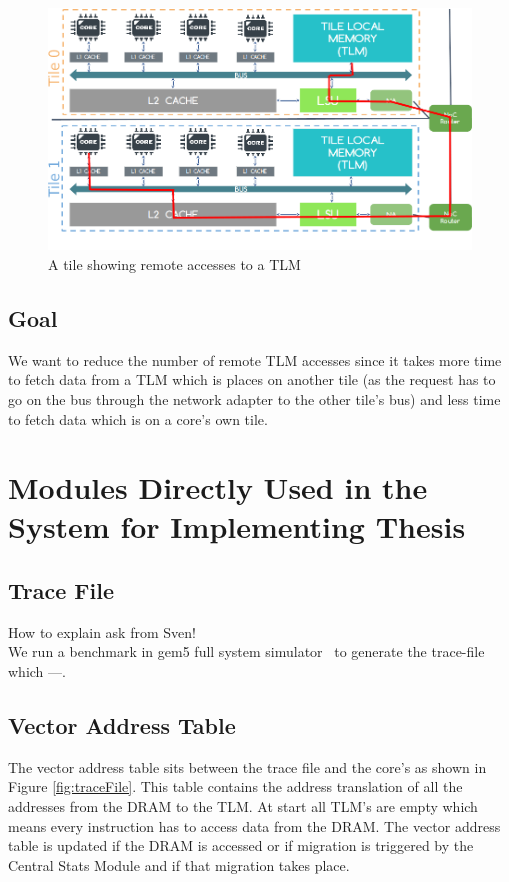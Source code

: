 \documentclass{listhesis}
\begin{document}
\begin{figure}
  \includegraphics[width=\linewidth]{remoteaccesses.png}
  \centering
  \caption{A tile showing remote accesses to a TLM}
  \label{fig:remoteaccesses}
\end{figure}
\subsection{Goal}
We want to reduce the number of remote TLM accesses since it takes more time to fetch data from a TLM which is places on another tile (as the request has to go on the bus through the network adapter to the other tile's bus) and less time to fetch data which is on a core's own tile.  
\section{Modules Directly Used in the System for Implementing Thesis}
\subsection{Trace File}
How to explain ask from Sven! 
\\
We run a benchmark in gem5 full system simulator~\cite{gem5} to generate the trace-file which ---. 
\subsection{Vector Address Table}
The vector address table sits between the trace file and the core's as shown in Figure \ref{fig:traceFile}. This table contains the address translation of all the addresses from the DRAM to the TLM. At start all TLM's are empty which means every instruction has to access data from the DRAM. The vector address table is updated if the DRAM is accessed or if migration is triggered by the Central Stats Module and if that migration takes place.
\end{document}
